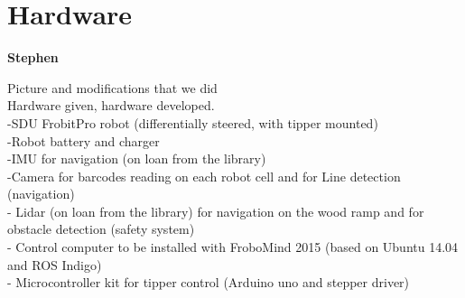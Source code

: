 \section{Hardware} %
\label{sec:mr_hardware}

\textbf{Stephen}

Picture and modifications that we did
\\
Hardware given, hardware developed.\\

-SDU FrobitPro robot (differentially steered, with tipper mounted)\\
-Robot battery and charger\\
-IMU for navigation (on loan from the library)\\
-Camera for barcodes reading on each robot cell and for Line detection (navigation)\\
- Lidar (on loan from the library) for navigation on the wood ramp and for obstacle detection (safety system)\\
- Control computer to be installed with FroboMind 2015 (based on Ubuntu 14.04 and ROS Indigo)\\
- Microcontroller kit for tipper control (Arduino uno and stepper driver)\\

